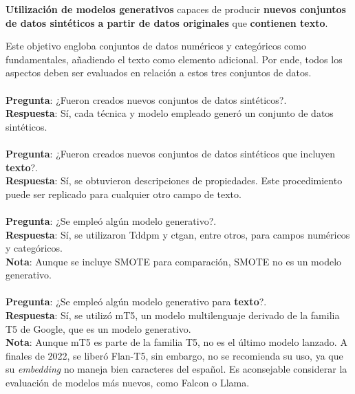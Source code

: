 \begin{tcolorbox}[colback=white,colframe=black!50!white,title=Objetivo especifico 1: Modelos generativos]
\textbf{Utilización de modelos generativos} capaces de producir \textbf{nuevos conjuntos de datos sintéticos} \textbf{a partir de datos originales} que \textbf{contienen texto}.
\end{tcolorbox}
Este objetivo engloba conjuntos de datos numéricos y categóricos como fundamentales, añadiendo el texto como elemento adicional. Por ende, todos los aspectos deben ser evaluados en relación a estos tres conjuntos de datos.
\\
\\
\textbf{Pregunta}: ¿Fueron creados nuevos conjuntos de datos sintéticos?. \\
\textbf{Respuesta}: Sí, cada técnica y modelo empleado generó un conjunto de datos sintéticos. \textcolor{green}{}
\\
\\
\textbf{Pregunta}: ¿Fueron creados nuevos conjuntos de datos sintéticos que incluyen \textbf{texto}?. \\
\textbf{Respuesta}: Sí, se obtuvieron descripciones de propiedades. Este procedimiento puede ser replicado para cualquier otro campo de texto. \textcolor{green}{}
\\
\\
\textbf{Pregunta}: ¿Se empleó algún modelo generativo?. \\
\textbf{Respuesta}: Sí, se utilizaron Tddpm y ctgan, entre otros, para campos numéricos y categóricos. \textcolor{green}{}\\
\textbf{Nota}: Aunque se incluye SMOTE para comparación, SMOTE no es un modelo generativo. \textcolor{orange}{\faExclamationTriangle}
\\
\\
\textbf{Pregunta}: ¿Se empleó algún modelo generativo para \textbf{texto}?. \\
\textbf{Respuesta}: Sí, se utilizó mT5, un modelo multilenguaje derivado de la familia T5 de Google, que es un modelo generativo. \textcolor{green}{} \\
\textbf{Nota}: Aunque mT5 es parte de la familia T5, no es el último modelo lanzado. A finales de 2022, se liberó Flan-T5, sin embargo, no se recomienda su uso, ya que su \emph{embedding} no maneja bien caracteres del español. Es aconsejable considerar la evaluación de modelos más nuevos, como Falcon o Llama. \textcolor{orange}{\faExclamationTriangle}
\\
